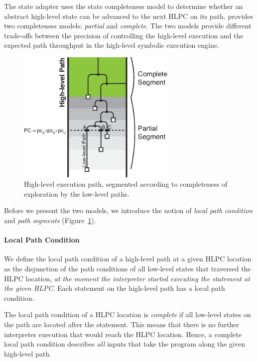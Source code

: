 The state adapter uses the state completeness model to determine whether an abstract high-level state can be advanced to the next HLPC on its path.
%
\chef provides two completeness models: \emph{partial} and \emph{complete}.
%
The two models provide different trade-offs between the precision of controlling the high-level execution and the expected path throughput in the high-level symbolic execution engine.

\begin{figure}
  \centering
  \includegraphics[width=3in]{figures/chef/path-segments}
  \caption{High-level execution path, segmented according to completeness of exploration by the low-level paths.}
  \label{fig:chef:path-segments}
\end{figure}

Before we present the two models, we introduce the notion of \emph{local path condition} and \emph{path segments} (Figure~\ref{fig:chef:path-segments}).

\paragraph{Local Path Condition}

We define the local path condition of a high-level path at a given HLPC location as the disjunction of the path conditions of all low-level states that traversed the HLPC location, \emph{at the moment the interpreter started executing the statement at the given HLPC}.
%
Each statement on the high-level path has a local path condition.

The local path condition of a HLPC location is \emph{complete} if all low-level states on the path are located after the statement.
%
This means that there is no further interpreter execution that would reach the HLPC location.
%
Hence, a complete local path condition describes \emph{all} inputs that take the program along the given high-level path.

